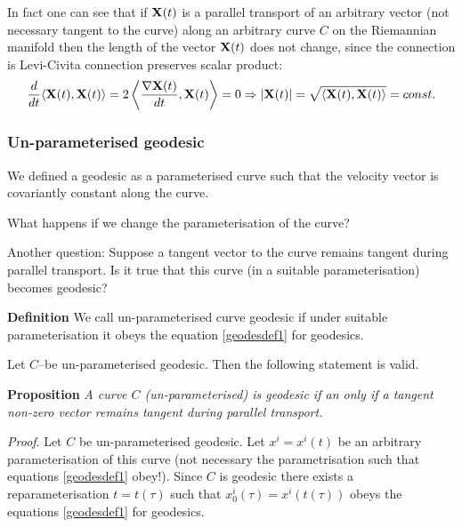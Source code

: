 \documentclass[12pt]{article}
\theoremstyle{theorem}
\numberwithin{equation}{section}
\begin{document}
{\m

In fact one can see that if ${\bf X}(t)$ is a parallel transport of an arbitrary vector (not necessary tangent to the curve)
along an arbitrary  curve
$C$ on the Riemannian manifold then the length of the vector ${\bf X}(t)$ does not change,
since the connection is Levi-Civita
connection preserves scalar product:
     \begin{equation}\label{lengthdoesnotchangeduringparalleltransport}
{d\over dt}\langle{\bf X}(t),{\bf X}(t)\rangle=
2\left\langle{\nabla {\bf X}(t)\over dt}, {\bf X}(t)\right\rangle=0\Rightarrow
   |{\bf X}(t)|=\sqrt{\langle{\bf X}(t),{\bf X}(t)\rangle}=const.
     \end{equation}


\subsubsection {Un-parameterised geodesic}

We defined a geodesic as a parameterised curve such that the velocity vector
is covariantly constant along the curve.

\m

What happens if we change the parameterisation of the curve?


\m

  Another  question:  Suppose a tangent vector to the curve remains tangent during parallel transport.
  Is it true that this curve (in a suitable parameterisation) becomes geodesic?

\m

 {\bf Definition}  We call un-parameterised curve geodesic if under suitable parameterisation it obeys
   the equation \eqref{geodesdef1} for geodesics.

\m


   Let $C$--be un-parameterised geodesic.
   Then the following statement is valid.

\m

   {\bf Proposition} {\it A curve $C$ (un-parameterised) is geodesic if an only if a tangent non-zero vector remains tangent
   during parallel transport.}

   \m
   {\sl Proof}. Let $C$ be un-parameterised geodesic.
     Let $x^i=x^i(t)$ be an arbitrary parameterisation of this curve (not necessary the parametrisation such that
   equations \eqref{geodesdef1} obey!).   Since $C$ is geodesic
   there exists a reparameterisation $t=t(\tau)$
such that  $x_0^i(\tau)=x^i(t(\tau))$ obeys the equations \eqref{geodesdef1} for geodesics.

}
\end{document}
